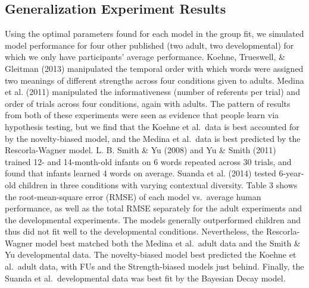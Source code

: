 \documentclass[10pt, letterpaper]{article}
\begin{document}
\hypertarget{generalization-experiment-results}{%
\subsection{Generalization Experiment
Results}\label{generalization-experiment-results}}

Using the optimal parameters found for each model in the group fit, we
simulated model performance for four other published (two adult, two
developmental) for which we only have participants' average performance.
Koehne, Trueswell, \& Gleitman (2013) manipulated the temporal order
with which words were assigned two meanings of different strengths
across four conditions given to adults. Medina et al. (2011) manipulated
the informativeness (number of referents per trial) and order of trials
across four conditions, again with adults. The pattern of results from
both of these experiments were seen as evidence that people learn via
hypothesis testing, but we find that the Koehne et al.~data is best
accounted for by the novelty-biased model, and the Medina et al.~data is
best predicted by the Rescorla-Wagner model. L. B. Smith \& Yu (2008)
and Yu \& Smith (2011) trained 12- and 14-month-old infants on 6 words
repeated across 30 trials, and found that infants learned 4 words on
average. Suanda et al. (2014) tested 6-year-old children in three
conditions with varying contextual diversity. Table 3 shows the
root-mean-square error (RMSE) of each model vs.~average human
performance, as well as the total RMSE separately for the adult
experiments and the developmental experiments. The models generally
outperformed children and thus did not fit well to the developmental
conditions. Nevertheless, the Rescorla-Wagner model best matched both
the Medina et al.~adult data and the Smith \& Yu developmental data. The
novelty-biased model best predicted the Koehne et al.~adult data, with
FUs and the Strength-biased models just behind. Finally, the Suanda et
al.~developmental data was best fit by the Bayesian Decay model.
\end{document}

